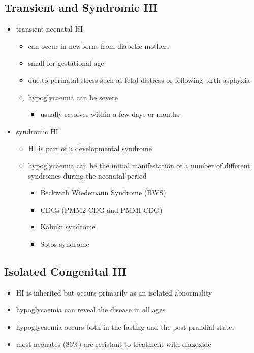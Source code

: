 \documentclass{scrartcl}
\begin{document}
\subsection{Transient and Syndromic HI}
\label{sec:org137629e}
\begin{itemize}
\item transient neonatal HI
\begin{itemize}
\item can occur in newborns from diabetic mothers
\item small for gestational age
\item due to perinatal stress such as fetal distress or following birth asphyxia
\item hypoglycaemia can be severe
\begin{itemize}
\item usually resolves within a few days or months
\end{itemize}
\end{itemize}
\item syndromic HI
\begin{itemize}
\item HI is part of a developmental syndrome
\item hypoglycaemia can be the initial manifestation of a number of
different syndromes during the neonatal period
\begin{itemize}
\item Beckwith Wiedemann Syndrome (BWS)
\item CDGs (PMM2-CDG and PMMI-CDG)
\item Kabuki syndrome
\item Sotos syndrome
\end{itemize}
\end{itemize}
\end{itemize}

\subsection{Isolated Congenital HI}
\label{sec:org5dfc8b0}
\begin{itemize}
\item HI is inherited but occurs primarily as an isolated abnormality
\item hypoglycaemia can reveal the disease in all ages
\item hypoglycaemia occurs both in the fasting and the post-prandial states
\item most neonates (86\%) are resistant to treatment with diazoxide
\end{itemize}
\end{document}
